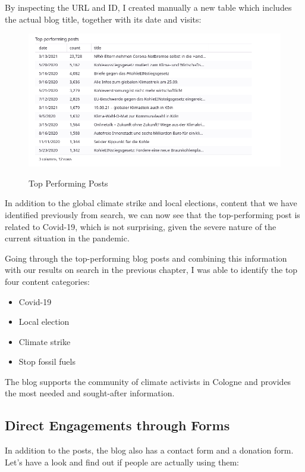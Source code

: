 By inspecting the URL and ID, I created manually a new table which includes the actual blog title, together with its date and visits:

\begin{figure}[H]
\centering
\caption {Top Performing Posts}
\includegraphics[width=\linewidth]{images/figure13.png}
\label{fig:manualReview}
\end{figure}

In addition to the global climate strike and local elections, content that we have identified previously from search, we can now see that the top-performing post is related to Covid-19, which is not surprising, given the severe nature of the current situation in the pandemic.

Going through the top-performing blog posts and combining this information with our results on search in the previous chapter, I was able to identify the top four content categories:

\begin{itemize}
 \item Covid-19
 \item Local election
 \item Climate strike
 \item Stop fossil fuels
\end{itemize}

The blog supports the community of climate activists in Cologne and provides the most needed and sought-after information.

\subsection{Direct Engagements through Forms}

In addition to the posts, the blog also has a contact form and a donation form. Let's have a look and find out if people are actually using them:

